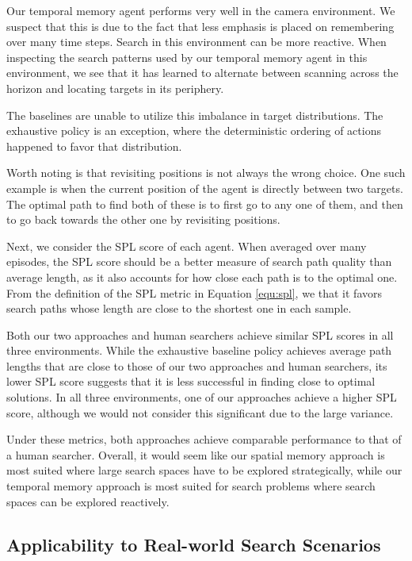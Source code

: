 Our temporal memory agent performs very well in the camera environment.
We suspect that this is due to the fact that less emphasis is placed on remembering over many time steps.
Search in this environment can be more reactive.
When inspecting the search patterns used by our temporal memory agent in this environment, we see that it has learned to alternate between scanning across the horizon and locating targets in its periphery.

The baselines are unable to utilize this imbalance in target distributions.
The exhaustive policy is an exception, where the deterministic ordering of actions happened to favor that distribution. 

Worth noting is that revisiting positions is not always the wrong choice.
One such example is when the current position of the agent is directly between two targets.
The optimal path to find both of these is to first go to any one of them, and then to go back towards the other one by revisiting positions.

Next, we consider the SPL score of each agent.
When averaged over many episodes, the SPL score should be a better measure of search path quality than average length, as it also accounts for how close each path is to the optimal one.
From the definition of the SPL metric in Equation \ref{equ:spl}, we that it favors search paths whose length are close to the shortest one in each sample.

Both our two approaches and human searchers achieve similar SPL scores in all three environments.
While the exhaustive baseline policy achieves average path lengths that are close to those of our two approaches and human searchers, its lower SPL score suggests that it is less successful in finding close to optimal solutions.
In all three environments, one of our approaches achieve a higher SPL score,
although we would not consider this significant due to the large variance.

Under these metrics, both approaches achieve comparable performance to that of a human searcher. Overall, it would seem like our spatial memory approach is most suited where large search spaces have to be explored strategically, while our temporal memory approach is most suited for search problems where search spaces can be explored reactively.

\subsection{Applicability to Real-world Search Scenarios}

